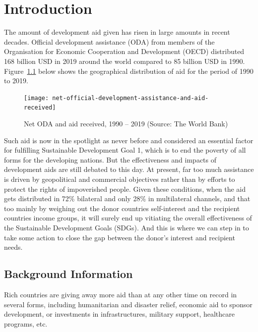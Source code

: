 \documentclass{swfuthesise}
\begin{document}
\tableofcontents %
\newpage
\thispagestyle{empty}
\listoffigures
\listoftables
\listoffixmes
\clearpage
{}

\chapter{Introduction}

The amount of development aid given has risen in large amounts in recent decades. Official development assistance (ODA) from members of the Organisation for Economic Cooperation and Development (OECD) distributed 168 billion USD in 2019 around the world compared to 85 billion USD in 1990. Figure~\ref{fig:net} below shows the geographical distribution of aid for the
period of 1990 to 2019. 

\begin{figure}[htp]
  \centering
  \texttt{[image: net-official-development-assistance-and-aid-received]}
  \caption{Net ODA and aid received, 1990 -- 2019 (Source: The World Bank)}
  \label{fig:net}
\end{figure}
  
Such aid is now in the spotlight as never before and considered an essential factor for fulfilling Sustainable Development Goal 1, which is to end the poverty of all forms for the developing nations. But the effectiveness and impacts of development aids are still debated to this day. At present, far too much assistance is driven by geopolitical and commercial objectives rather than by efforts to protect the rights of impoverished people. Given these conditions, when the aid gets distributed in 72\% bilateral and only 28\% in multilateral channels, and that too mainly by weighing out the donor countries self-interest and the recipient countries income groups, it will surely end up vitiating the overall effectiveness of the Sustainable Development Goals (SDGs). And this is where we can step in to take some action to close the gap between the donor's interest and recipient needs.

\section{Background Information}

Rich countries are giving away more aid than at any other time on record in several forms, including humanitarian and disaster relief, economic aid to sponsor development, or investments in infrastructures, military support, healthcare programs, etc. 
\end{document}
